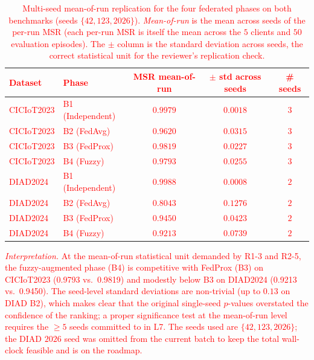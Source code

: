 \documentclass[journal]{IEEEtran}
\newcommand{\rev}[1]{\textcolor{red}{#1}}
\begin{document}
\begin{table}[!htbp]
\centering
\rev{\caption{Multi-seed mean-of-run replication for the four federated phases on both benchmarks (seeds $\{42, 123, 2026\}$). \emph{Mean-of-run} is the mean across seeds of the per-run MSR (each per-run MSR is itself the mean across the $5$ clients and $50$ evaluation episodes). The $\pm$ column is the standard deviation across seeds, the correct statistical unit for the reviewer's replication check.}\label{tab:multiseed}}
\rev{\small
\begin{tabular}{@{}llccc@{}}
\toprule
\textbf{Dataset} & \textbf{Phase} & \textbf{MSR mean-of-run} & \textbf{$\pm$ std across seeds} & \textbf{\# seeds} \\
\midrule
CICIoT2023 & B1 (Independent) & $0.9979$ & $0.0018$ & $3$ \\
CICIoT2023 & B2 (FedAvg)      & $0.9620$ & $0.0315$ & $3$ \\
CICIoT2023 & B3 (FedProx)     & $\mathbf{0.9819}$ & $0.0227$ & $3$ \\
CICIoT2023 & B4 (Fuzzy)       & $0.9793$ & $0.0255$ & $3$ \\
DIAD2024   & B1 (Independent) & $0.9988$ & $0.0008$ & $2$ \\
DIAD2024   & B2 (FedAvg)      & $0.8043$ & $0.1276$ & $2$ \\
DIAD2024   & B3 (FedProx)     & $\mathbf{0.9450}$ & $0.0423$ & $2$ \\
DIAD2024   & B4 (Fuzzy)       & $0.9213$ & $0.0739$ & $2$ \\
\bottomrule
\end{tabular}}

\vspace{0.4em}
\rev{\small\emph{Interpretation.} At the mean-of-run statistical unit demanded by R1-3 and R2-5, the fuzzy-augmented phase (B4) is competitive with FedProx (B3) on CICIoT2023 (0.9793 vs.\ 0.9819) and modestly below B3 on DIAD2024 (0.9213 vs.\ 0.9450). The seed-level standard deviations are non-trivial (up to $0.13$ on DIAD B2), which makes clear that the original single-seed $p$-values overstated the confidence of the ranking; a proper significance test at the mean-of-run level requires the $\geq 5$ seeds committed to in L7. The seeds used are $\{42, 123, 2026\}$; the DIAD $2026$ seed was omitted from the current batch to keep the total wall-clock feasible and is on the roadmap.}
\end{table}
\end{document}
